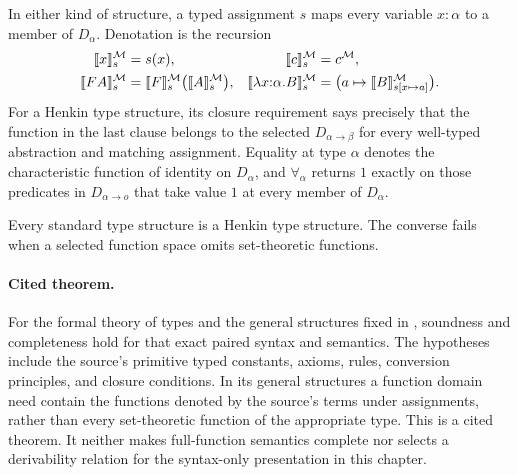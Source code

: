 \documentclass[11pt,oneside,openany]{book}
\theoremstyle{definition}
\theoremstyle{plain}
\theoremstyle{remark}
\DeclarePairedDelimiter{\sem}{\llbracket}{\rrbracket}
\begin{document}
In either kind of structure, a typed assignment \(s\) maps every variable
\(x{:}\alpha\) to a member of \(D_\alpha\).  Denotation is the recursion
\[
\begin{aligned}
  \sem{x}^{\mathcal M}_s&=s(x),
  &\sem{c}^{\mathcal M}_s&=c^{\mathcal M},\\
  \sem{FA}^{\mathcal M}_s
    &=\sem{F}^{\mathcal M}_s\bigl(\sem{A}^{\mathcal M}_s\bigr),
  &\sem{\lambda x{:}\alpha.B}^{\mathcal M}_s
    &=\bigl(a\mapsto
       \sem{B}^{\mathcal M}_{s[x\mapsto a]}\bigr).
\end{aligned}
\]
For a Henkin type structure, its closure requirement says precisely that the
function in the last clause belongs to the selected
\(D_{\alpha\to\beta}\) for every well-typed abstraction and matching
assignment.  Equality at type \(\alpha\) denotes the characteristic function
of identity on \(D_\alpha\), and \(\forall_\alpha\) returns \(1\) exactly on
those predicates in \(D_{\alpha\to o}\) that take value \(1\) at every member
of \(D_\alpha\).

Every standard type structure is a Henkin type structure.  The converse fails
when a selected function space omits set-theoretic functions.

\paragraph{Cited theorem.}
For the formal theory of types and the general structures fixed in
\cite[pp.~81--91]{Henkin1950}, soundness and completeness hold for that exact
paired syntax and semantics.  The hypotheses include the source's primitive
typed constants, axioms, rules, conversion principles, and closure conditions.
In its general structures a function domain need contain the functions denoted
by the source's terms under assignments, rather than every set-theoretic
function of the appropriate type.  This is a cited theorem.  It neither makes
full-function semantics complete nor selects a derivability relation for the
syntax-only presentation in this chapter.
\end{document}
